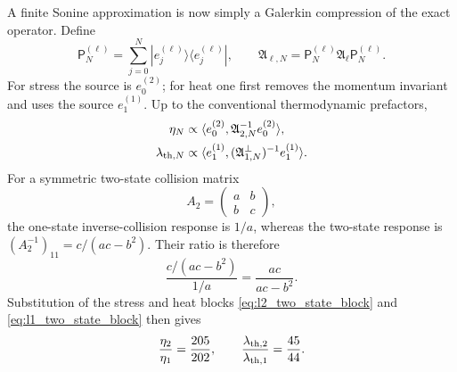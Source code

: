 \documentclass[11pt]{article}
\numberwithin{equation}{section}
\theoremstyle{definition}
\begin{document}
A finite Sonine approximation is now simply a Galerkin compression of the
exact operator.  Define
\begin{equation}
 \mathsf P_N^{(\ell)}
 =\sum_{j=0}^{N}|e_j^{(\ell)}\rangle\langle e_j^{(\ell)}|,
 \qquad
 \mathfrak A_{\ell,N}
 =\mathsf P_N^{(\ell)}\mathfrak A_\ell\mathsf P_N^{(\ell)}.
 \label{eq:finite_compression_sonine}
\end{equation}
For stress the source is $e_0^{(2)}$; for heat one first removes the momentum
invariant and uses the source $e_1^{(1)}$.  Up to the conventional
thermodynamic prefactors,
\begin{align}
 \eta_N&\propto
 \langle e_0^{(2)},\mathfrak A_{2,N}^{-1}e_0^{(2)}\rangle,
 \label{eq:eta_N_practical}
 \\
 \lambda_{{\rm th},N}&\propto
 \langle e_1^{(1)},(\mathfrak A_{1,N}^{\perp})^{-1}e_1^{(1)}\rangle.
 \label{eq:lambda_N_practical}
\end{align}
For a symmetric two-state collision matrix
\begin{equation}
 A_2=\begin{pmatrix}a&b\\b&c\end{pmatrix},
\end{equation}
the one-state inverse-collision response is $1/a$, whereas the two-state
response is $(A_2^{-1})_{11}=c/(ac-b^2)$.  Their ratio is therefore
\begin{equation}
 \frac{c/(ac-b^2)}{1/a}=\frac{ac}{ac-b^2}.
 \label{eq:two_state_inverse_ratio}
\end{equation}
Substitution of the stress and heat blocks
\eqref{eq:l2_two_state_block} and \eqref{eq:l1_two_state_block} then gives
\begin{equation}
 \frac{\eta_2}{\eta_1}=\frac{205}{202},
 \qquad
 \frac{\lambda_{{\rm th},2}}{\lambda_{{\rm th},1}}=\frac{45}{44}.
 \label{eq:second_sonine_ratios}
\end{equation}
\end{document}
